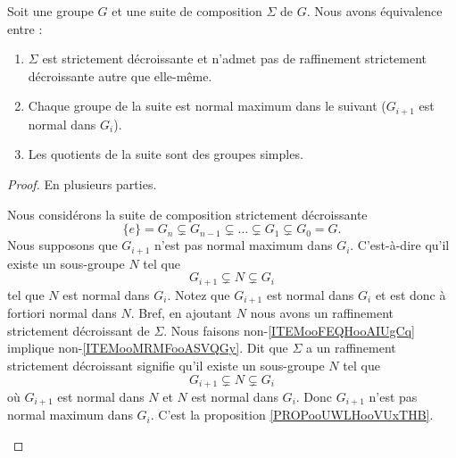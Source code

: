 \begin{proposition}	\label{PROPooEQKFooHPeLCR}
	Soit une groupe \( G\) et une suite de composition \( \Sigma\) de \( G\). Nous avons équivalence entre :
	\begin{enumerate}
		\item		\label{ITEMooFEQHooAIUgCq}
		      \( \Sigma\) est strictement décroissante et n'admet pas de raffinement strictement décroissante autre que elle-même.
		\item		\label{ITEMooMRMFooASVQGy}
		      Chaque groupe de la suite est normal maximum dans le suivant (\( G_{i+1}\) est normal dans \( G_i\)).
		\item		\label{ITEMooPPKHooJBpDGj}
		      Les quotients de la suite sont des groupes simples.
	\end{enumerate}
\end{proposition}

\begin{proof}
	En plusieurs parties.
	\begin{subproof}
		\spitem[\ref{ITEMooFEQHooAIUgCq} \( \Rightarrow\) \ref{ITEMooMRMFooASVQGy}]
		Nous considérons la suite de composition strictement décroissante
		\begin{equation}
			\{ e \}=G_n\subsetneq G_{n-1}\subsetneq\ldots\subsetneq G_1\subsetneq G_0=G.
		\end{equation}
		Nous supposons que \( G_{i+1}\) n'est pas normal maximum dans \( G_i\). C'est-à-dire qu'il existe un sous-groupe \( N\) tel que
		\begin{equation}
			G_{i+1}\subsetneq N\subsetneq G_i
		\end{equation}
		tel que \( N\) est normal dans \( G_i\). Notez que \( G_{i+1}\) est normal dans \( G_i\) et est donc à fortiori normal dans \( N\). Bref, en ajoutant \( N\) nous avons un raffinement strictement décroissant de \( \Sigma\).
		\spitem[\ref{ITEMooMRMFooASVQGy} \( \Rightarrow\) \ref{ITEMooFEQHooAIUgCq}]
		Nous faisons non-\ref{ITEMooFEQHooAIUgCq} implique non-\ref{ITEMooMRMFooASVQGy}. Dit que \( \Sigma\) a un raffinement strictement décroissant signifie qu'il existe un sous-groupe \( N\) tel que
		\begin{equation}
			G_{i+1}\subsetneq N\subsetneq G_i
		\end{equation}
		où \( G_{i+1}\) est normal dans \( N\) et \( N\) est normal dans \( G_i\). Donc \( G_{i+1}\) n'est pas normal maximum dans \( G_i\).
		\spitem[\ref{ITEMooMRMFooASVQGy} \( \Leftrightarrow\) \ref{ITEMooPPKHooJBpDGj}]
		C'est la proposition \ref{PROPooUWLHooVUxTHB}.
	\end{subproof}
\end{proof}

